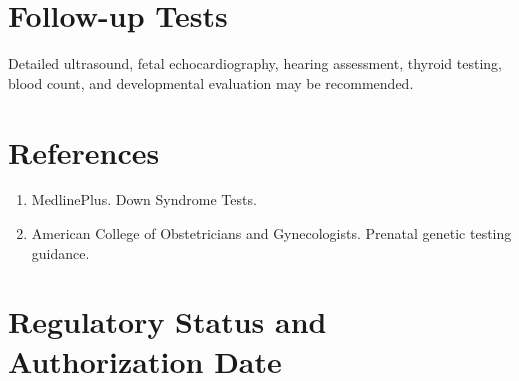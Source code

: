 \section*{Follow-up Tests} Detailed ultrasound, fetal echocardiography, hearing assessment, thyroid testing, blood count, and developmental evaluation may be recommended.
\section*{References} \begin{enumerate}\item MedlinePlus. Down Syndrome Tests.\item American College of Obstetricians and Gynecologists. Prenatal genetic testing guidance.\end{enumerate}
\clearpage\section*{Regulatory Status and Authorization Date}\clearpage
